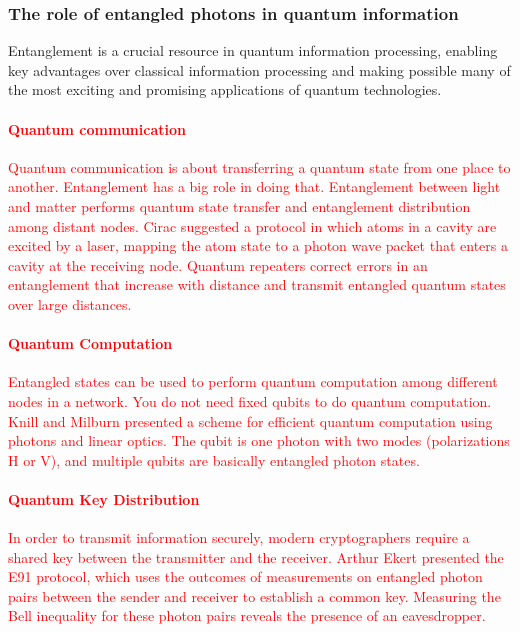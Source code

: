 \subsubsection{The role of entangled photons in quantum information}
Entanglement is a crucial resource in quantum information processing, enabling key advantages over classical information processing and making possible many of the most exciting and promising applications of quantum technologies.
\textcolor{red}{
\paragraph{Quantum communication}
Quantum communication is about transferring a quantum state from one place to another. Entanglement has a big role in doing that. Entanglement between light and matter performs quantum state transfer and entanglement distribution among distant nodes. Cirac \cite{Circ1997} suggested a protocol in which atoms in a cavity are excited by a laser, mapping the atom state to a photon wave packet that enters a cavity at the receiving node. Quantum repeaters \cite{Briegel1997} correct errors in an entanglement that increase with distance and transmit entangled quantum states over large distances.
\paragraph{Quantum Computation}
Entangled states can be used to perform quantum computation among different nodes in a network. You do not need fixed qubits to do quantum computation. Knill and Milburn \cite{Knill2001} presented a scheme for efficient quantum computation using photons and linear optics. The qubit is one photon with two modes (polarizations H or V), and multiple qubits are basically entangled photon states.
\paragraph{Quantum Key Distribution}
In order to transmit information securely, modern cryptographers require a shared key between the transmitter and the receiver. Arthur Ekert \cite{Ekert1991} presented the E91 protocol, which uses the outcomes of measurements on entangled photon pairs between the sender and receiver to establish a common key. Measuring the Bell inequality for these photon pairs reveals the presence of an eavesdropper.
}
